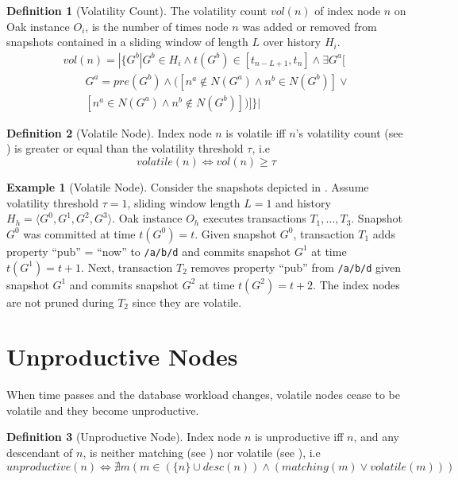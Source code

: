 \documentclass[abstracton,12pt]{scrartcl}
\theoremstyle{definition}
\newtheorem{definition}{Definition}
\newtheorem{example}{Example}
\begin{document}
\begin{definition}[Volatility Count]
  The volatility count $vol(n)$ of index node $n$ on Oak instance $O_i$, is the number of
  times node $n$ was added or removed from snapshots contained in a sliding
  window of length $L$ over history $H_i$.
  \begin{align*}
    vol(n) = | \{ G^b | G^b \in H_i \land t(G^b) \in [t_{n-L+1}, t_n] \land \exists G^a[ \\
    \qquad G^a = pre(G^b) \land ([n^a \notin N(G^a) \land n^b \in N(G^b)]\lor \\
    \qquad [n^a \in N(G^a) \land n^b \notin N(G^b)] )]\} |
  \end{align*}
  \label{def:vol_count}
\end{definition}

\begin{definition}[Volatile Node]
  Index node $n$ is volatile iff $n$'s volatility count (see
  ) is greater or equal than the volatility threshold
  $\tau$, i.e
  $$ volatile(n) \iff vol(n) \geq \tau $$
  \label{def:volatile_node}
\end{definition}

\begin{example}[Volatile Node]
  Consider the snapshots depicted in . Assume volatility
  threshold $\tau = 1$, sliding window length $L = 1$ and history $H_h
  = \langle G^0,G^1,G^2,G^3 \rangle$. Oak instance $O_h$ executes transactions
  $T_1, \dots , T_3$. Snapshot $G^0$ was committed at time $t(G^0) =
  t$. Given snapshot $G^0$, transaction $T_1$ adds property ``pub'' = ``now'' to
  \texttt{/a/b/d} and commits snapshot $G^1$ at time $t(G^1) = t + 1$. Next,
  transaction $T_2$ removes property ``pub'' from \texttt{/a/b/d} given snapshot
  $G^1$ and commits snapshot $G^2$ at time $t(G^2) = t + 2$. The index nodes are
  not pruned during $T_2$ since they are volatile.
  \label{ex:volatile_node}
\end{example}

\section{Unproductive Nodes}

When time passes and the database workload changes, volatile nodes cease to be
volatile and they become unproductive.

\begin{definition}[Unproductive Node]
  Index node $n$ is unproductive iff $n$, and any descendant of
  $n$, is neither matching (see ) nor volatile (see
  ), i.e
  $$ unproductive(n) \iff \nexists m (m \in (\{n\} \cup desc(n)) \land
  (matching(m) \lor volatile(m)))$$
\end{definition}
\end{document}
